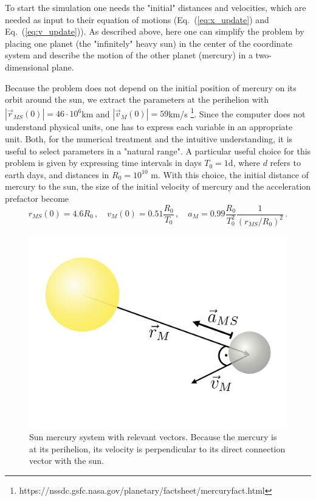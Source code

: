 \documentclass[12pt]{iopart}
\newcommand{\abs}[1]{\left\vert #1 \right\vert}
\begin{document}
To start the simulation one needs the "initial" distances and velocities, which are needed as input to their equation of motions (Eq.~(\ref{eq:x_update}) and Eq.~(\ref{eq:v_update})).  As described above, here  one can simplify the problem by placing one planet (the "infinitely" heavy sun) in the center of the coordinate system and describe the motion of the other planet (mercury) in a two-dimensional plane.  

Because the problem does not depend on the initial position of mercury on its orbit around the sun, we extract the parameters at the perihelion with $ \abs{\vec r_{MS}(0)} = 46 \cdot 10^6$km and $ \abs{\vec v_M(0)} = 59$km/s \footnote{https://nssdc.gsfc.nasa.gov/planetary/factsheet/mercuryfact.html}.  Since the computer does not understand physical units, one has to express each variable in an appropriate unit.  Both, for the numerical treatment and the intuitive understanding, it is useful to select parameters in a "natural range".  A particular useful choice for this problem is given by expressing time intervals in days $T_0 = 1$d, where $d$ refers to earth days, and distances in $R_0 = 10^{10}$ m.  With this choice, the initial distance of mercury to the sun, the size of the initial velocity of mercury and the acceleration prefactor become
\begin{equation}
r_{MS}(0) = 4.6 R_0 \, , \quad
v_{M}(0)  = 0.51 \frac{R_0}{T_0} \, ,  \quad
a_M       = 0.99 \frac{R_0}{T_0^2} \frac{1}{\left(r_{MS}/R_0\right)^2}
\, .
\end{equation}

%
\begin{figure}[htb]
	\centering
	\includegraphics[width=.4\textwidth]{figs/sun_merc.pdf}
	\caption{\label{fig:sun_merc}Sun mercury system with relevant vectors.  Because the mercury is at its perihelion, its velocity is perpendicular to its direct connection vector with the sun.}
\end{figure}
%
\end{document}
